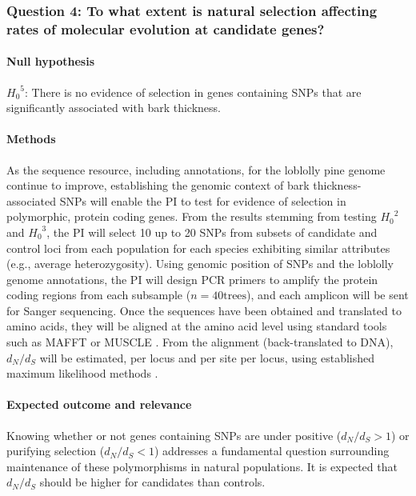 \subsubsection*{Question 4: To what extent is natural selection affecting rates of molecular evolution at candidate genes?}

\paragraph{Null hypothesis} ${H_0}^5$: There is no evidence of selection in genes containing SNPs that are significantly associated 
with bark thickness.

\paragraph{Methods} As the sequence resource, including annotations, for the loblolly pine genome continue to improve, 
establishing the genomic context of bark thickness-associated SNPs will enable the PI to test for evidence of selection in 
polymorphic, protein coding genes.  From the results stemming from testing ${H_0}^2$ and ${H_0}^3$, the PI will select 
10 up to 20 SNPs from subsets of candidate and control loci from each population for each species exhibiting similar attributes 
(e.g., average heterozygosity).   Using genomic position of SNPs and the loblolly genome annotations, the PI will design 
PCR primers to amplify the protein coding regions from each subsample ($n = 40 \text{trees}$), and each amplicon will be 
sent for Sanger sequencing.  
Once the sequences have been obtained and translated to amino acids, they will be aligned at the amino acid level using 
standard tools such as MAFFT \citep{Katoh:2005ia} or MUSCLE \citep{Edgar:2004ic}.  From the alignment (back-translated 
to DNA), $d_N/d_S$ will be estimated, per locus and per site per locus, using established maximum likelihood methods 
\citep{Yang:2007ki}.

\paragraph{Expected outcome and relevance}  Knowing whether or not genes containing SNPs are under positive ($d_N/d_S > 1$) or 
purifying selection ($d_N/d_S < 1$) addresses a fundamental question surrounding maintenance of these polymorphisms in 
natural populations.  It is expected that $d_N/d_S$ should be higher for candidates than controls.

